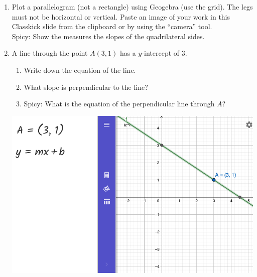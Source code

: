 \begin{enumerate}
\item Plot a parallelogram (not a rectangle) using Geogebra (use the grid). The legs must not be horizontal or vertical. Paste an image of your work in this Classkick slide from the clipboard or by using the ``camera'' tool.\\[0.25cm]
Spicy: Show the measures the slopes of the quadrilateral sides.

\item A line through the point $A(3,1)$ has a $y$-intercept of 3. 
\begin{enumerate}
  \item Write down the equation of the line.
  \item What slope is perpendicular to the line?
  \item Spicy: What is the equation of the perpendicular line through $A$?
\end{enumerate}
\includegraphics[width=15cm]{../graphics/06perpendicular-line-graph.png}


\end{enumerate}

